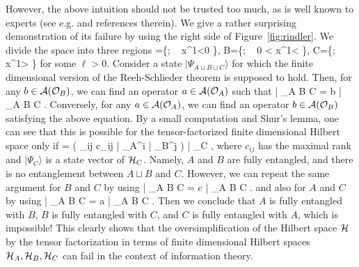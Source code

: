 \documentclass[12pt,a4paper]{article}
\theoremstyle{plain}
\theoremstyle{definition}
\numberwithin{thm}{section}
\newcommand{\ket}[1]{ | {#1} \rangle }
\def\CA{{\cal A}}
\def\CH{{\cal H}}
\def\CO{{\cal O}}
\def\beq#1\eeq{\begin{align}#1\end{align}}
\begin{document}
However, the above intuition should not be trusted too much, as is well known to experts (see e.g. \cite{Witten:2018zxz} and references therein).
We give a rather surprising demonstration of its failure by using the right side of Figure~\ref{fig:rindler}. 
We divide the space into three regions
\beq
A=\{; ~ x^1<0 \}, \qquad B=\{; ~ 0 < x^1< \ell\}, \qquad C=\{; ~ x^1> \ell \}
\eeq
for some $\ell>0$. Consider a state $\ket{\Psi_{A \sqcup B \sqcup C}}$ for which the finite dimensional version of the Reeh-Schlieder theorem is supposed to hold.
Then, for any $b \in \CA(\CO_B)$, we can find an operator $a \in \CA(\CO_A)$ such that
\beq
a\ket{\Psi_{A \sqcup B \sqcup C}} = b \ket{\Psi_{A \sqcup B \sqcup C}}.
\eeq
Conversely, for any $a \in \CA(\CO_A)$, we can find an operator $b \in \CA(\CO_B)$ satisfying the above equation.
By a small computation and Shur's lemma, one can see that this is possible for the tensor-factorized finite dimensional Hilbert space only if
\beq
\ket{\Psi_{A \sqcup B \sqcup C}} = \left( \sum_{ij} c_{ij}\ket{\psi_A^i} \otimes \ket{\psi_B^j} \right) \otimes \ket{\Psi_C},
\eeq
where $c_{ij}$ has the maximal rank and $\ket{\Psi_C}$ is a state vector of $\CH_C$. 
Namely, $A$ and $B$ are fully entangled, and there is no entanglement between $A \sqcup B$ and $C$.
However, we can repeat the same argument for $B$ and $C$ by using 
\beq
b\ket{\Psi_{A \sqcup B \sqcup C}} = c \ket{\Psi_{A \sqcup B \sqcup C}}.
\eeq
and also for $A$ and $C$ by using
\beq
c\ket{\Psi_{A \sqcup B \sqcup C}} = a \ket{\Psi_{A \sqcup B \sqcup C}}.
\eeq
Then we conclude that $A$ is fully entangled with $B$, $B$ is fully entangled with $C$, and $C$ is fully entangled with $A$, which is impossible!
This clearly shows that the oversimplification of the Hilbert space $\CH$ by the tensor factorization in terms of finite dimensional Hilbert spaces $\CH_A,\CH_B, \CH_C$ can fail in the context of
information theory.
\end{document}
